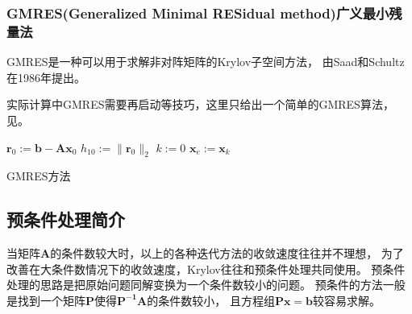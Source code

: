 \subsubsection{GMRES(Generalized Minimal RESidual method)广义最小残量法}
GMRES是一种可以用于求解非对阵矩阵的Krylov子空间方法，
由Saad和Schultz在1986年提出。\cite{saad1986gmres}

实际计算中GMRES需要再启动等技巧，这里只给出一个简单的GMRES算法，
见。\cite{golub2012matrix}

\begin{algorithm}

$\bm{r}_0 := \bm{b}-\bm{A}\bm{x}_0$ \algoend
$h_{10}:=\| \bm{r}_0\|_2$ \algoend
$k:=0$\;
$\bm{x}_e:=\bm{x}_k$\;
\caption{\label{alg:gpu.gmres}GMRES方法}
\end{algorithm}


\subsection{预条件处理简介}
\label{sec:gpu.krylov-precond}
当矩阵$\bm{A}$的条件数较大时，以上的各种迭代方法的收敛速度往往并不理想，
为了改善在大条件数情况下的收敛速度，Krylov往往和预条件处理共同使用。
预条件处理的思路是把原始问题同解变换为一个条件数较小的问题。
预条件的方法一般是找到一个矩阵$\bm{P}$使得$\bm{P^{-1}A}$的条件数较小，
且方程组$\bm{Px}=\bm{b}$较容易求解。\cite{saad2003iterative}

